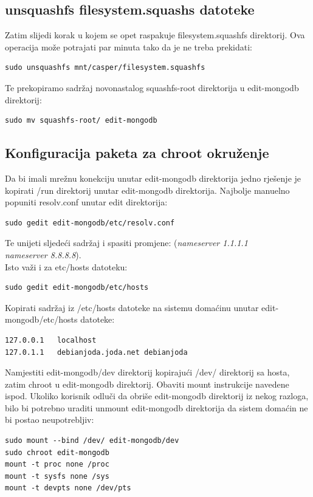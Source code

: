 \documentclass[12pt,vi]{mitthesis}
\begin{document}
\subsection*{unsquashfs filesystem.squashs datoteke}
\noindent
Zatim slijedi korak u kojem se opet raspakuje filesystem.squashfs direktorij. Ova operacija može potrajati par minuta tako da je ne treba prekidati:\\
\begin{lstlisting}[style=BashInputStyle]
sudo unsquashfs mnt/casper/filesystem.squashfs
\end{lstlisting}

Te prekopiramo sadržaj novonastalog squashfs-root direktorija u edit-mongodb direktorij:
\begin{lstlisting}[style=BashInputStyle]
sudo mv squashfs-root/ edit-mongodb
\end{lstlisting}

\subsection*{Konfiguracija paketa za chroot okruženje}
\noindent
Da bi imali mrežnu konekciju unutar edit-mongodb direktorija jedno rješenje je kopirati /run direktorij unutar edit-mongodb direktorija.
Najbolje manuelno popuniti resolv.conf unutar edit direktorija:
\begin{lstlisting}[style=BashInputStyle]
sudo gedit edit-mongodb/etc/resolv.conf
\end{lstlisting}
Te unijeti sljedeći sadržaj i spasiti promjene:
(\textit{nameserver 1.1.1.1 \\
nameserver 8.8.8.8}).\\
\noindent
Isto važi i za etc/hosts datoteku:
\begin{lstlisting}[style=BashInputStyle]
sudo gedit edit-mongodb/etc/hosts
\end{lstlisting}
Kopirati sadržaj iz /etc/hosts datoteke na sistemu domaćinu unutar edit-mongodb/etc/hosts datoteke:
\begin{lstlisting}
127.0.0.1	localhost
127.0.1.1	debianjoda.joda.net	debianjoda
\end{lstlisting}
\noindent
Namjestiti edit-mongodb/dev direktorij kopirajući /dev/ direktorij sa hosta, zatim chroot u edit-mongodb direktorij.
Obaviti mount instrukcije navedene ispod. Ukoliko korisnik odluči da obriše edit-mongodb direktorij iz nekog razloga,
bilo bi potrebno uraditi unmount edit-mongodb direktorija da sistem domaćin ne bi postao neupotrebljiv:
\begin{lstlisting}[style=BashInputStyle]
sudo mount --bind /dev/ edit-mongodb/dev
sudo chroot edit-mongodb
mount -t proc none /proc
mount -t sysfs none /sys
mount -t devpts none /dev/pts
\end{lstlisting}
\end{document}
